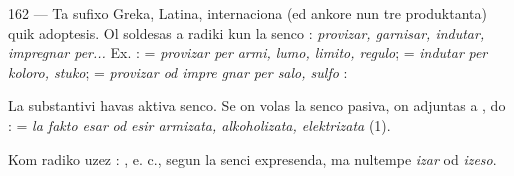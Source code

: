 \begin{VUpage}[166]{162}
 --- Ta sufixo Greka, Latina, internaciona (ed ankore\nl
nun tre produktanta) quik adoptesis. Ol soldesas a radiki\nl
kun la senco : \textit{provizar, garnisar, indutar, impregnar per...}\nl
Ex. :  = \textit{provizar per}\nl
\textit{armi, lumo, limito, regulo};  = \textit{indutar}\nl
\textit{per koloro, stuko};  = \textit{provizar od impre}\cc
\textit{gnar per salo, sulfo} : \nl
{}

La substantivi  havas aktiva\nl
senco. Se on volas la senco pasiva, on adjuntas  a , do\nl
{} :  = \textit{la fakto esar}\nl
\textit{od esir armizata, alkoholizata, elektrizata} (1).

Kom radiko uzez : , e. c.,\nl
segun la senci expresenda, ma nultempe \textit{izar} od \textit{izeso}.
\end{VUpage}

